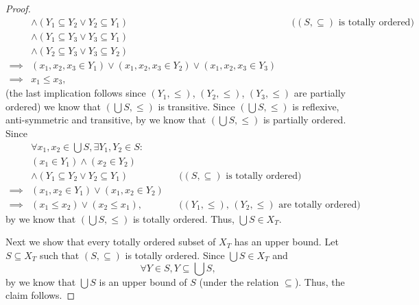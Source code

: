 \begin{proof}
\begin{align*}
             & \land (Y_1 \subseteq Y_2 \lor Y_2 \subseteq Y_1)                                  &  & \text{(\((S, \subseteq)\) is totally ordered)} \\
             & \land (Y_1 \subseteq Y_3 \lor Y_3 \subseteq Y_1)                                                                                      \\
             & \land (Y_2 \subseteq Y_3 \lor Y_3 \subseteq Y_2)                                                                                      \\
    \implies & (x_1, x_2, x_3 \in Y_1) \lor (x_1, x_2, x_3 \in Y_2) \lor (x_1, x_2, x_3 \in Y_3)                                                     \\
    \implies & x_1 \leq x_3,
  \end{align*}
  (the last implication follows since \((Y_1, \leq)\), \((Y_2, \leq)\), \((Y_3, \leq)\) are partially ordered)
  we know that \((\bigcup S, \leq)\) is transitive.
  Since \((\bigcup S, \leq)\) is reflexive, anti-symmetric and transitive, by  we know that \((\bigcup S, \leq)\) is partially ordered.
  Since
  \begin{align*}
             & \forall x_1, x_2 \in \bigcup S, \exists Y_1, Y_2 \in S :                                                                    \\
             & (x_1 \in Y_1) \land (x_2 \in Y_2)                                                                                           \\
             & \land (Y_1 \subseteq Y_2 \lor Y_2 \subseteq Y_1)         &  & \text{(\((S, \subseteq)\) is totally ordered)}                \\
    \implies & (x_1, x_2 \in Y_1) \lor (x_1, x_2 \in Y_2)                                                                                  \\
    \implies & (x_1 \leq x_2) \lor (x_2 \leq x_1),                      &  & \text{(\((Y_1, \leq)\), \((Y_2, \leq)\) are totally ordered)}
  \end{align*}
  by  we know that \((\bigcup S, \leq)\) is totally ordered.
  Thus, \(\bigcup S \in X_T\).

  Next we show that every totally ordered subset of \(X_T\) has an upper bound.
  Let \(S \subseteq X_T\) such that \((S, \subseteq)\) is totally ordered.
  Since \(\bigcup S \in X_T\) and
  \[
    \forall Y \in S, Y \subseteq \bigcup S,
  \]
  by  we know that \(\bigcup S\) is an upper bound of \(S\) (under the relation \(\subseteq\)).
  Thus, the claim follows.


\end{proof}
